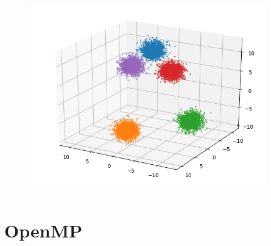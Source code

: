 \documentclass[xcolor=table]{beamer}
\begin{document}
\begin{frame}
\begin{columns}[c]
\vspace{-1cm}

\begin{figure}
\includegraphics[width=0.92\textwidth]{img/example_clustered}
\end{figure}

\end{columns}
\end{frame}


\section{OpenMP}
\end{document}
